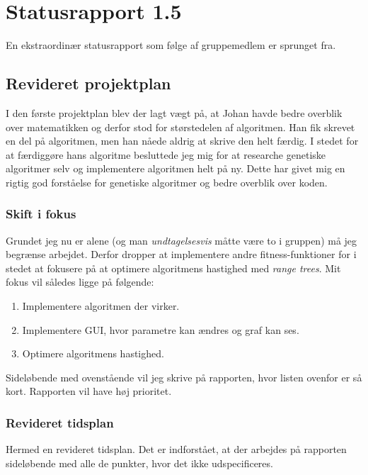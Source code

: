 
\section{Statusrapport 1.5}

En ekstraordinær statusrapport som følge af gruppemedlem er sprunget fra. 

\subsection{Revideret projektplan}

I den første projektplan blev der lagt vægt på, at Johan havde bedre overblik
over matematikken og derfor stod for størstedelen af algoritmen. Han fik skrevet
en del på algoritmen, men han nåede aldrig at skrive den helt færdig. I stedet
for at færdiggøre hans algoritme besluttede jeg mig for at researche genetiske
algoritmer selv og implementere algoritmen helt på ny. Dette har givet mig en
rigtig god forståelse for genetiske algoritmer og bedre overblik over koden. 

\subsubsection{Skift i fokus}

Grundet jeg nu er alene (og man \textit{undtagelsesvis} måtte være to i gruppen)
må jeg begrænse arbejdet. Derfor dropper at implementere andre
fitness-funktioner for i stedet at fokusere på at optimere algoritmens
hastighed med \textit{range trees}. Mit fokus vil således ligge på følgende: 

\begin{enumerate}
    \item Implementere algoritmen der virker.  
    \item Implementere GUI, hvor parametre kan ændres og graf kan ses. 
    \item Optimere algoritmens hastighed. 
\end{enumerate}

Sideløbende med ovenstående vil jeg skrive på rapporten, hvor listen ovenfor er
så kort. Rapporten vil have høj prioritet. 

\subsubsection{Revideret tidsplan}

Hermed en revideret tidsplan. Det er indforstået, at der arbejdes på rapporten
sideløbende med alle de punkter, hvor det ikke udspecificeres. 

